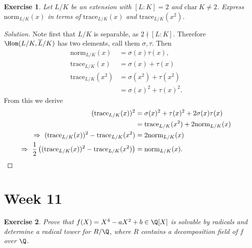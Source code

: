 \documentclass[a4paper,10pt,reqno]{amsart}
\newtheorem{ex}{Exercise}[section]
\newenvironment{sol}
  {\renewcommand\qedsymbol{$\blacksquare$}\begin{proof}[Solution]}
  {\end{proof}}
\begin{document}
\begin{ex}
\label{10.5}
    Let $L/K$ be an extension with $[L:K] = 2$ and $\mathrm{char}\ K \neq 2$. Express $\mathrm{norm}_{L/K}(x)$ in terms of $\mathrm{trace}_{L/K}(x)$ and $\mathrm{trace}_{L/K}(x^2)$.
\end{ex}
\begin{sol}
    Note first that $L/K$ is separable, as $2 \nmid [L:K]$. Therefore $\Hom(L/K,\overline{L}/K)$ has two elements, call them $\sigma,\tau$. Then
    \begin{align*}
        \mathrm{norm}_{L/K}(x) & = \sigma(x)\tau(x), \\
        \mathrm{trace}_{L/K}(x) & = \sigma(x)+ \tau(x) \\
         \mathrm{trace}_{L/K}(x^2) & = \sigma(x^2) + \tau(x^2) \\
         & = \sigma(x)^2 + \tau(x)^2.
    \end{align*}
    From this we derive
    \begin{align*}
        (\mathrm{trace}_{L/K}(x))^2 & = \sigma(x)^2 + \tau(x)^2 + 2 \sigma(x)\tau(x) \\
        & = \mathrm{trace}_{L/K}(x^2) + 2 \mathrm{norm}_{L/K}(x) \\
       \Rightarrow \ (\mathrm{trace}_{L/K}(x))^2 - \mathrm{trace}_{L/K}(x^2) & = 2 \mathrm{norm}_{L/K}(x) \\
       \Rightarrow \ \frac{1}{2} \left( (\mathrm{trace}_{L/K}(x))^2 - \mathrm{trace}_{L/K}(x^2) \right) & =  \mathrm{norm}_{L/K}(x).\qedhere
    \end{align*}
\end{sol}

\newpage

\section{Week 11}

\begin{ex}
\label{11.1}
    Prove that $f(X)=X^4-aX^2+b\in \Q[X]$ is solvable by radicals
    and determine a radical tower for $R/\Q$,
    where $R$ contains a decomposition field of $f$ over $\Q$.
\end{ex}
\end{document}
